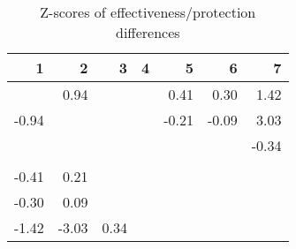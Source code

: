 \begin{table}[ht]
\centering
\begin{tabular}{rrrrrrr}
  \hline
1 & 2 & 3 & 4 & 5 & 6 & 7 \\ 
  \hline
 & 0.94 &  &  & 0.41 & 0.30 & 1.42 \\ 
  -0.94 &  &  &  & -0.21 & -0.09 & 3.03 \\ 
   &  &  &  &  &  & -0.34 \\ 
   &  &  &  &  &  &  \\ 
  -0.41 & 0.21 &  &  &  &  &  \\ 
  -0.30 & 0.09 &  &  &  &  &  \\ 
  -1.42 & -3.03 & 0.34 &  &  &  &  \\ 
   \hline
\end{tabular}
\caption{Z-scores of effectiveness/protection differences} 
\end{table}
